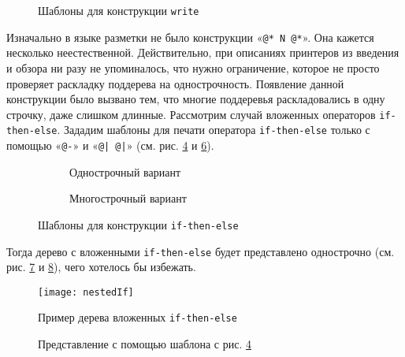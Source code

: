 \begin{figure}[h]
	\begin{subfigure}[h]{0.45\textwidth}
		
		\caption{}
		\label{fig:writeTmplt1}
	\end{subfigure}
	\begin{subfigure}[h]{0.45\textwidth}
		
		\caption{}
		\label{fig:writeTmplt2}
	\end{subfigure}
	\caption{Шаблоны для конструкции \lstinline{write}}
\end{figure}

Изначально в языке разметки не было конструкции «\lstinline{@* N @*}». Она кажется несколько неестественной. Действительно, при описаниях принтеров из введения и обзора ни разу не упоминалось, что нужно ограничение, которое не просто проверяет раскладку поддерева на однострочность.
Появление данной конструкции было вызвано тем, что многие поддеревья раскладовались в одну строчку, даже слишком длинные. Рассмотрим случай вложенных операторов \lstinline{if-then-else}. Зададим шаблоны для печати оператора \lstinline{if-then-else} только с помощью «\lstinline{@-}» и «\lstinline{@| @|}» (см. рис. \ref{fig:flatBadIfTmplt} и \ref{fig:multBadIfTmplt}).

\begin{figure}[h]
	\begin{subfigure}[h]{0.45\textwidth}
		
		\caption{Однострочный вариант}
		\label{fig:flatBadIfTmplt}
	\end{subfigure}
	\begin{subfigure}[h]{0.45\textwidth}
		
		\caption{Многострочный вариант}
		\label{fig:multBadIfTmplt}
	\end{subfigure}
	\caption{Шаблоны для конструкции \lstinline{if-then-else}}
\end{figure}

Тогда дерево с вложенными \lstinline{if-then-else} будет представлено однострочно (см. рис. \ref{fig:nestedIf} и \ref{fig:nestedIfFlatCode}), чего хотелось бы избежать.

\begin{figure}[ht]
	\centering
	\texttt{[image: nestedIf]}
	\caption{Пример дерева вложенных \lstinline{if-then-else}}
	\label{fig:nestedIf}
\end{figure}

\begin{figure}[ht]
	\centering
	
	\caption{Представление с помощью шаблона с рис. \ref{fig:flatBadIfTmplt}}
	\label{fig:nestedIfFlatCode}
\end{figure}


